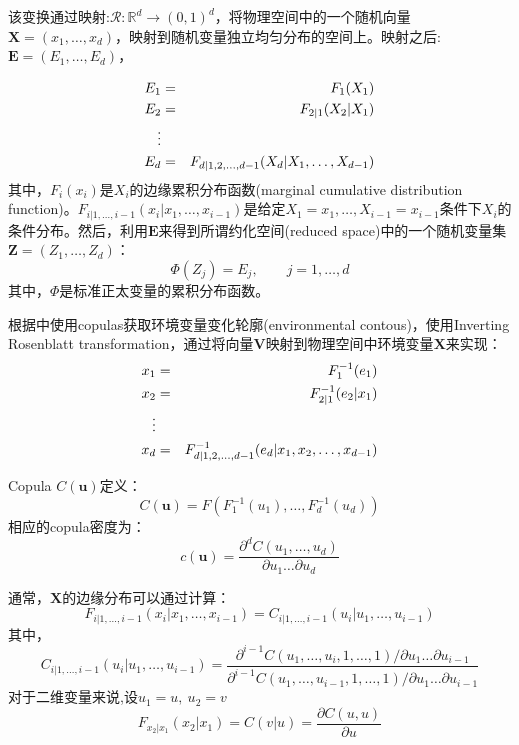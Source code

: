 该变换通过映射:$\mathcal{R}: \mathbb{R}^d \rightarrow (0,1)^d$，将物理空间中的一个随机向量$\mathbf{X}=(x_1,\dots,x_d)$，映射到随机变量独立均匀分布的空间上。映射之后:$\mathbf{E} = (E_1,\dots,E_d)$\cite{Montes2015}，

\begin{eqnarray}
    E_1 &=& F_1(X_1)  \notag \\
    E_2 &=& F_{2|1}(X_2|X_1) \notag \\
    \vdots \\
    E_d &=& F_{d|1,2,\dots,d-1} (X_d | X_1,\dots,X_{d-1}) \notag
    \label{eq-rosenblatt}
\end{eqnarray}
其中，$F_i(x_i)$是$X_i$的\textcolor[rgb]{1,0,0}{边缘累积分布函数(marginal cumulative distribution function)}。$F_{i|1,\dots,i-1}(x_i|x_1,\dots,x_{i-1})$是给定$X_1 = x_1,\dots,X_{i-1}=x_{i-1}$条件下$X_i$的条件分布。然后，利用$\mathbf{E}$来得到所谓\textcolor[rgb]{1,0,0}{约化空间(reduced space)}中的一个随机变量集$\mathbf{Z} = (Z_1,\dots,Z_d)$：
\begin{equation}
    \Phi (Z_j) = E_j, \qquad j=1,\dots,d
    \label{eq-cdf}
\end{equation}
其中，$\Phi$是标准正太变量的累积分布函数。

根据\cite{Montes2015}中使用copulas获取环境变量变化轮廓(environmental contous)，使用\textcolor[rgb]{1,0,0}{Inverting Rosenblatt transformation}，通过将向量$\mathbf{V}$映射到物理空间中环境变量$\mathbf{X}$来实现：
\begin{eqnarray}
    \label{eq-invervse-rosenblatt}
    x_1 &=& F_1^{-1}(e_1)  \notag \\
    x_2 &=& F_{2|1}^{-1}(e_2|x_1) \notag \\
    \vdots \\
    x_d &=& F_{d|1,2,\dots,d-1}^{-1} (e_d | x_1,x_2,\dots,x_{d-1}) \notag
\end{eqnarray}

Copula $C(\mathbf{u})$定义：
\begin{equation}
    \label{eq-cf}
    C(\mathbf{u}) = F(F_1^{-1}(u_1),\dots,F_d^{-1}(u_d))
\end{equation}
相应的copula密度为：
\begin{equation}
    \label{eq-cfd}
    c(\mathbf{u}) = \dfrac{\partial^d C(u_1,\dots,u_d)}{\partial u_1\dots\partial u_d}
\end{equation}

通常，$\mathbf{X}$的边缘分布可以通过计算：
\begin{equation}
    \label{eq-margin}
    F_{i|1,\dots,i-1}(x_i|x_1,\dots,x_{i-1}) = C_{i|1,\dots,i-1}(u_i|u_1,\dots,u_{i-1})
\end{equation}
其中，
\begin{equation}
    \label{eq-margin2}
    C_{i|1,\dots,i-1}(u_i|u_1,\dots,u_{i-1}) = \dfrac{\partial^{i-1}C(u_1,\dots,u_i,1,\dots,1)/\partial u_1\dots\partial u_{i-1}}{\partial^{i-1}C(u_1,\dots,u_{i-1},1,\dots,1)/\partial u_1\dots\partial u_{i-1}} 
\end{equation}
对于二维变量来说,设$u_1 = u,\ u_2 = v$
\begin{equation}
    \label{eq-bivariate}
    F_{x_2|x_1}(x_2|x_1) = C(v|u) = \dfrac{\partial C(u,u)}{\partial u}
\end{equation}

